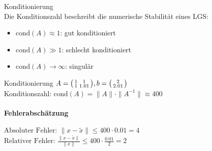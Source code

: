 \begin{concept}{Konditionierung}\\
Die Konditionszahl beschreibt die numerische Stabilität eines LGS:
\begin{itemize}
    \item $\text{cond}(A) \approx 1$: gut konditioniert
    \item $\text{cond}(A) \gg 1$: schlecht konditioniert
    \item $\text{cond}(A) \to \infty$: singulär
\end{itemize}
\end{concept}

\begin{example2}{Konditionierung}
$A = \begin{psmallmatrix}
1 & 1\\
1 & 1.01
\end{psmallmatrix}, b = \begin{psmallmatrix}
2\\
2.01
\end{psmallmatrix}$\\
Konditionszahl:
$\text{cond}(A) = \|A\| \cdot \|A^{-1}\| \approx 400$
\paragraph{Fehlerabschätzung}
$\text{Absoluter Fehler: }\|x - \tilde{x}\| \leq 400 \cdot 0.01 = 4$ \\
$\text{Relativer Fehler: }\frac{\|x - \tilde{x}\|}{\|x\|} \leq 400 \cdot \frac{0.01}{2} = 2$
\end{example2}


